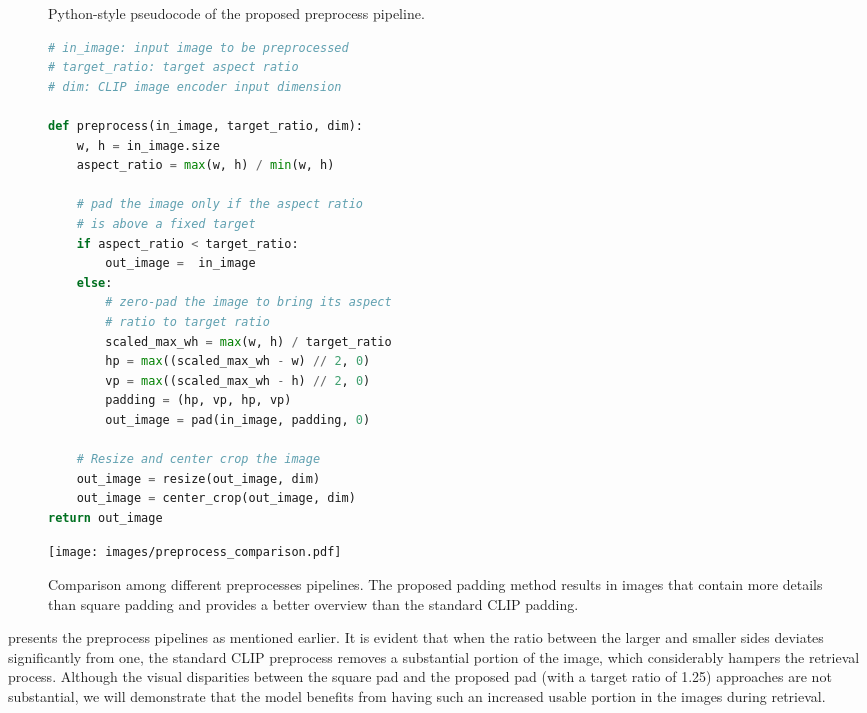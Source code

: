 \documentclass[acmlarge]{acmart}
\begin{document}
\begin{figure}[t]
\centering
\begin{minipage}[t!]{0.50\textwidth}
\begin{algorithm}[H]
\centering
   \caption{Python-style pseudocode of the proposed preprocess pipeline.}
   \label{alg:preprocess}
   
\begin{lstlisting}[language=python]
# in_image: input image to be preprocessed
# target_ratio: target aspect ratio
# dim: CLIP image encoder input dimension

def preprocess(in_image, target_ratio, dim):
    w, h = in_image.size
    aspect_ratio = max(w, h) / min(w, h)

    # pad the image only if the aspect ratio 
    # is above a fixed target
    if aspect_ratio < target_ratio:
        out_image =  in_image
    else:
        # zero-pad the image to bring its aspect
        # ratio to target ratio
        scaled_max_wh = max(w, h) / target_ratio
        hp = max((scaled_max_wh - w) // 2, 0)
        vp = max((scaled_max_wh - h) // 2, 0)
        padding = (hp, vp, hp, vp)
        out_image = pad(in_image, padding, 0)

    # Resize and center crop the image
    out_image = resize(out_image, dim)
    out_image = center_crop(out_image, dim)                               
return out_image
\end{lstlisting}
\end{algorithm}
\end{minipage}
\hfill
\begin{minipage}[c]{0.46\textwidth}
        \centering
        \texttt{[image: images/preprocess\_comparison.pdf]}
        \caption{Comparison among different preprocesses pipelines. The proposed padding method results in images that contain more details than square padding and provides a better overview than the standard CLIP padding.}
        \label{fig:pre_comp}
    \end{minipage}
    \vspace{-3ex}
\end{figure}

 presents the preprocess pipelines as mentioned earlier. It is evident that when the ratio between the larger and smaller sides deviates significantly from one, the standard CLIP preprocess removes a substantial portion of the image, which considerably hampers the retrieval process. Although the visual disparities between the square pad and the proposed pad (with a target ratio of 1.25) approaches are not substantial, we will demonstrate that the model benefits from having such an increased usable portion in the images during retrieval.
\end{document}
